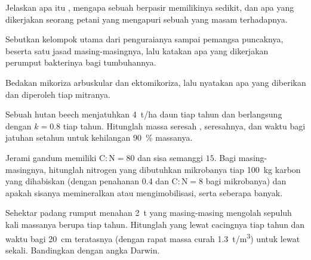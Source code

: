 \begin{exercise}[$\star$]\label{exo:b2:living-soil:2}
Jelaskan apa itu , mengapa sebuah  berpasir
memilikinya sedikit, dan apa yang dikerjakan seorang petani yang
mengapuri sebuah  yang masam terhadapnya.
\end{exercise}

\begin{exercise}[$\star$]\label{exo:b2:living-soil:3}
Sebutkan kelompok utama  dari penguraianya
sampai pemangsa puncaknya, beserta satu jasad masing-masingnya, lalu
katakan apa yang dikerjakan perumput bakterinya bagi tumbuhannya.
\end{exercise}

\begin{exercise}[$\star$]\label{exo:b2:living-soil:4}
Bedakan mikoriza arbuskular dan ektomikoriza, lalu nyatakan apa yang
diberikan dan diperoleh tiap mitranya.
\end{exercise}

\begin{exercise}[$\star\star$]\label{exo:b2:living-soil:5}
Sebuah hutan beech menjatuhkan \qty{4}{t/ha} daun tiap tahun dan
 berlangsung dengan $k = 0.8$ tiap tahun. Hitunglah massa
seresah ,  seresahnya, dan waktu bagi
jatuhan setahun untuk kehilangan \qty{90}{\%} massanya.
\end{exercise}

\begin{exercise}[$\star\star$]\label{exo:b2:living-soil:6}
Jerami gandum memiliki $\mathrm{C:N} = 80$ dan sisa semanggi $15$. Bagi
masing-masingnya, hitunglah nitrogen yang dibutuhkan mikrobanya tiap
\qty{100}{kg} karbon yang dihabiskan (dengan penahanan 0.4 dan
$\mathrm{C:N} = 8$ bagi mikrobanya) dan apakah sisanya memineralkan atau
mengimobilisasi, serta seberapa banyak.
\end{exercise}

\begin{exercise}[$\star\star$]\label{exo:b2:living-soil:7}
Sehektar padang rumput menahan \qty{2}{t}  yang
masing-masing mengolah sepuluh kali massanya berupa  tiap tahun.
Hitunglah  yang lewat cacingnya tiap tahun dan waktu bagi
\qty{20}{cm} teratasnya (dengan rapat massa curah \qty{1.3}{t/m^3})
untuk lewat sekali. Bandingkan dengan angka Darwin.
\end{exercise}

